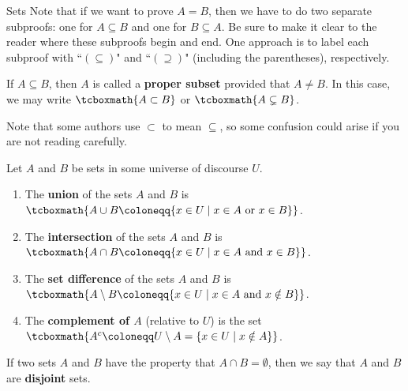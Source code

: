 \begin{section}{Sets}
Note that if we want to prove $A=B$, then we have to do two separate subproofs: one for $A\subseteq B$ and one for $B\subseteq A$. Be sure to make it clear to the reader where these subproofs begin and end. One approach is to label each subproof with ``$(\subseteq)$" and ``$(\supseteq)$" (including the parentheses), respectively.

\begin{definition}
If $A\subseteq B$, then $A$ is called a \textbf{proper subset} provided that $A\neq B$.  In this case, we may write $\tcboxmath{A\subset B}$ or $\tcboxmath{A\subsetneq B}$.
\end{definition}

Note that some authors use $\subset$ to mean $\subseteq$, so some confusion could arise if you are not reading carefully.

\begin{definition}
Let $A$ and $B$ be sets in some universe of discourse $U$.
\begin{enumerate}[label=\textrm{(\alph*)}]
\item The \textbf{union} of the sets $A$ and $B$ is $\tcboxmath{A \cup B \coloneqq \{x\in U \mid x\in A \mbox{ or } x\in B \}}$.
\item The \textbf{intersection} of the sets $A$ and $B$ is $\tcboxmath{A \cap B \coloneqq\{x\in U \mid x\in A \mbox{ and } x\in B \}}$.
\item The \textbf{set difference} of the sets $A$ and $B$ is $\tcboxmath{A \setminus B \coloneqq\{x\in U \mid x\in A \mbox{ and } x\notin B \}}$.
\item The \textbf{complement of $A$} (relative to $U$) is the set $\tcboxmath{A^c\coloneqq U \setminus A =\{x \in U \mid x \notin A\}}$.
\end{enumerate}
\end{definition}

\begin{definition}
If two sets $A$ and $B$ have the property that $A \cap B = \emptyset$, then we say that $A$ and $B$ are \textbf{disjoint} sets.
\end{definition}


\end{section}
